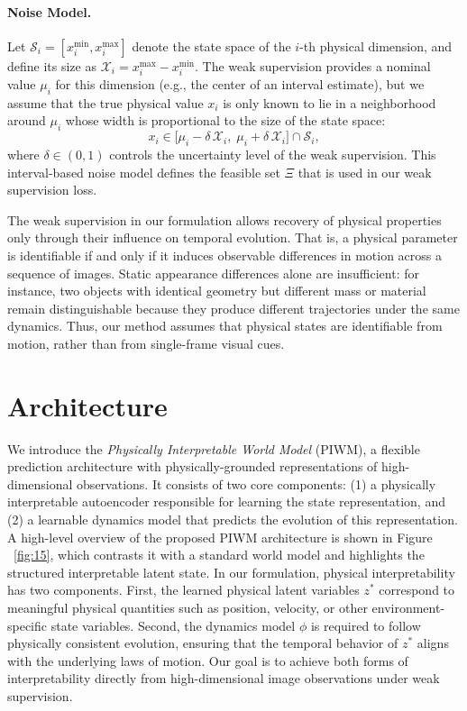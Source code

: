 \documentclass[sigconf]{acmart}
\begin{document}
\paragraph{Noise Model.}
Let $\mathcal{S}_i = [x_i^{\min}, x_i^{\max}]$ denote the state space of the $i$-th physical dimension, and define its size as
$\mathcal{X}_i = x_i^{\max} - x_i^{\min}$. 
The weak supervision provides a nominal value $\mu_i$ for this dimension (e.g., the center of an interval estimate), but we assume that the true physical value $x_i$ is only known to lie in a neighborhood around $\mu_i$ whose width is proportional to the size of the state space:
\[
    x_i \in \big[\mu_i - \delta\, \mathcal{X}_i,\; \mu_i + \delta\, \mathcal{X}_i\big] \cap \mathcal{S}_i ,
\]
where $\delta \in (0,1)$ controls the uncertainty level of the weak supervision. 
This interval-based noise model defines the feasible set $\Xi$ that is used in our weak supervision loss.


The weak supervision in our formulation allows recovery of physical properties only through their influence on temporal evolution. 
That is, a physical parameter is identifiable if and only if it induces observable differences in motion across a sequence of images. 
Static appearance differences alone are insufficient: for instance, two objects with identical geometry but different mass or material remain distinguishable because they produce different trajectories under the same dynamics. 
Thus, our method assumes that physical states are identifiable from motion, rather than from single-frame visual cues.




\section{Architecture}\label{sec:approach}

We introduce the \textit{Physically Interpretable World Model} (PIWM), a flexible prediction architecture with physically-grounded representations of high-dimensional observations. It consists of two core components: (1) a {physically interpretable autoencoder} responsible for learning the state representation, and (2) a {learnable dynamics model} that predicts the evolution of this representation. A high-level overview of the proposed PIWM architecture is shown in Figure ~\ref{fig:15}, which contrasts it with a standard world model and highlights the structured interpretable latent state. 
In our formulation, physical interpretability has two components. 
First, the learned physical latent variables $z^*$ correspond to meaningful physical quantities such as position, velocity, or other environment-specific state variables. 
Second, the dynamics model $\phi$ is required to follow physically consistent evolution, ensuring that the temporal behavior of $z^*$ aligns with the underlying laws of motion. 
Our goal is to achieve both forms of interpretability directly from high-dimensional image observations under weak supervision.
\end{document}
